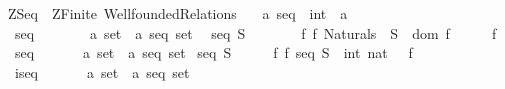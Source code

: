 %
\begin{isabellebody}%
\def\isabellecontext{ZSeq}%
%
\isamarkuptrue%
%
\isadelimtheory
%
\endisadelimtheory
%
\isatagtheory
{}\isamarkupfalse%
\ ZSeq\ \ ZFinite\ Wellfounded{\isacharunderscore}Relations\ %
\endisatagtheory
{\isafoldtheory}%
%
\isadelimtheory
%
\endisadelimtheory
\isanewline
\isanewline
{}\isamarkupfalse%
\isanewline
\ \ {\isacharprime}a\ {\isachardoublequoteopen}seq{\isachardoublequoteclose}\ {\isacharequal}\ {\isachardoublequoteopen}int\ {\isacharless}{\isacharequal}{\isachargreater}\ {\isacharprime}a{\isachardoublequoteclose}\isanewline
\isanewline
\ \ \isanewline
{}\isamarkupfalse%
\isanewline
\ \ seq\ \ \ \ \ \ \ \ {\isacharcolon}{\isacharcolon}{\isachardoublequoteopen}{\isacharprime}a\ set\ {\isacharequal}{\isachargreater}\ {\isacharparenleft}{\isacharprime}a\ seq{\isacharparenright}\ set{\isachardoublequoteclose}\ \isanewline
\ {\isachardoublequoteopen}seq\ S\ \ \ \ \ \ {\isacharequal}{\isacharequal}\ {\isacharbraceleft}\ f{\isachardot}\ {\isacharparenleft}f{\isacharcolon}\ {\isacharparenleft}Naturals\ {\isacharminus}{\isacharbar}{\isacharbar}{\isacharminus}{\isachargreater}\ S{\isacharparenright}{\isacharparenright}\ {\isacharampersand}\ {\isacharparenleft}dom\ f\ {\isacharequal}\ {\isacharparenleft}\ {}\ {\isachardot}{\isachardot}\ {\isacharparenleft}{\isacharhash}\ f{\isacharparenright}{\isacharparenright}{\isacharparenright}{\isacharbraceright}{\isachardoublequoteclose}\ \isanewline
\ \ seq{}\ \ \ \ \ \ \ {\isacharcolon}{\isacharcolon}{\isachardoublequoteopen}{\isacharprime}a\ set\ {\isacharequal}{\isachargreater}\ {\isacharparenleft}{\isacharprime}a\ seq{\isacharparenright}\ set{\isachardoublequoteclose}\isanewline
\ {\isachardoublequoteopen}seq{}\ S\ \ \ \ \ {\isacharequal}{\isacharequal}\ {\isacharbraceleft}f{\isachardot}\ f{\isacharcolon}\ {\isacharparenleft}seq\ S{\isacharparenright}\ {\isacharampersand}\ {\isacharparenleft}{\isacharparenleft}int\ {\isacharparenleft}{}{\isacharcolon}{\isacharcolon}nat{\isacharparenright}{\isacharparenright}\ {\isacharless}\ {\isacharparenleft}{\isacharhash}\ f{\isacharparenright}{\isacharparenright}{\isacharbraceright}{\isachardoublequoteclose}\isanewline
\ \ iseq\ \ \ \ \ \ \ {\isacharcolon}{\isacharcolon}{\isachardoublequoteopen}{\isacharprime}a\ set\ {\isacharequal}{\isachargreater}\ {\isacharparenleft}{\isacharprime}a\ seq{\isacharparenright}\ set{\isachardoublequoteclose}\isanewline

\end{isabellebody}
